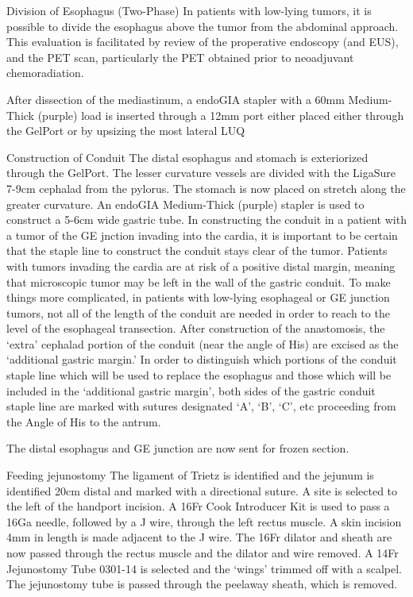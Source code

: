 \documentclass[
]{book}
\begin{document}
Division of Esophagus (Two-Phase)
In patients with low-lying tumors, it is possible to divide the esophagus above the tumor from the abdominal approach. This evaluation is facilitated by review of the properative endoscopy (and EUS), and the PET scan, particularly the PET obtained prior to neoadjuvant chemoradiation.

After dissection of the mediastinum, a endoGIA stapler with a 60mm Medium-Thick (purple) load is inserted through a 12mm port either placed either through the GelPort or by upsizing the most lateral LUQ

Construction of Conduit
The distal esophagus and stomach is exteriorized through the GelPort. The lesser curvature vessels are divided with the LigaSure 7-9cm cephalad from the pylorus. The stomach is now placed on stretch along the greater curvature. An endoGIA Medium-Thick (purple) stapler is used to construct a 5-6cm wide gastric tube. In constructing the conduit in a patient with a tumor of the GE jnction invading into the cardia, it is important to be certain that the staple line to construct the conduit stays clear of the tumor. Patients with tumors invading the cardia are at risk of a positive distal margin, meaning that microscopic tumor may be left in the wall of the gastric conduit. To make things more complicated, in patients with low-lying esophageal or GE junction tumors, not all of the length of the conduit are needed in order to reach to the level of the esophageal transection. After construction of the anastomosis, the `extra' cephalad portion of the conduit (near the angle of His) are excised as the `additional gastric margin.' In order to distinguish which portions of the conduit staple line which will be used to replace the esophagus and those which will be included in the `additional gastric margin', both sides of the gastric conduit staple line are marked with sutures designated `A', `B', `C', etc proceeding from the Angle of His to the antrum.

The distal esophagus and GE junction are now sent for frozen section.

Feeding jejunostomy
The ligament of Trietz is identified and the jejunum is identified 20cm distal and marked with a directional suture. A site is selected to the left of the handport incision. A 16Fr Cook Introducer Kit is used to pass a 16Ga needle, followed by a J wire, through the left rectus muscle. A skin incision 4mm in length is made adjacent to the J wire. The 16Fr dilator and sheath are now passed through the rectus muscle and the dilator and wire removed. A 14Fr Jejunostomy Tube 0301-14 is selected and the `wings' trimmed off with a scalpel. The jejunostomy tube is passed through the peelaway sheath, which is removed.
\end{document}
